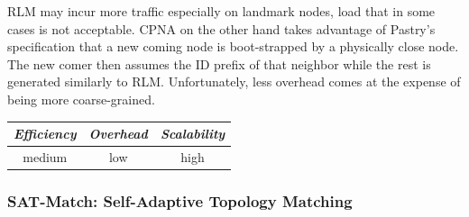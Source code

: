 RLM may incur more traffic especially on landmark nodes, load that in some cases
is not acceptable. CPNA on the other hand takes advantage of Pastry's
specification that a new coming node is boot-strapped by a physically close
node.
The new comer then assumes the ID prefix of that neighbor while the rest is
generated similarly to RLM. Unfortunately, less overhead comes at the expense
of being more coarse-grained.

%
%
%

\begin{center}
\begin{tabular}{ccc}
\emph{Efficiency} & \emph{Overhead} & \emph{Scalability} \\
\hline
%
medium &
low &
high
\end{tabular}
\end{center}

\subsubsection{SAT-Match: Self-Adaptive Topology Matching}


